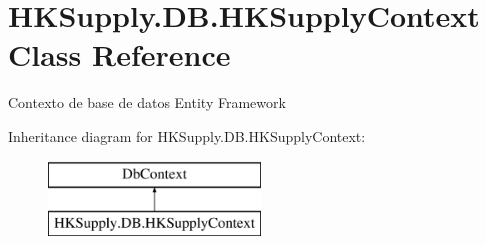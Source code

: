 \hypertarget{class_h_k_supply_1_1_d_b_1_1_h_k_supply_context}{}\section{H\+K\+Supply.\+D\+B.\+H\+K\+Supply\+Context Class Reference}
\label{class_h_k_supply_1_1_d_b_1_1_h_k_supply_context}


Contexto de base de datos Entity Framework  


Inheritance diagram for H\+K\+Supply.\+D\+B.\+H\+K\+Supply\+Context\+:\begin{figure}[H]
\begin{center}
\leavevmode
\includegraphics[height=2.000000cm]{class_h_k_supply_1_1_d_b_1_1_h_k_supply_context}
\end{center}
\end{figure}
